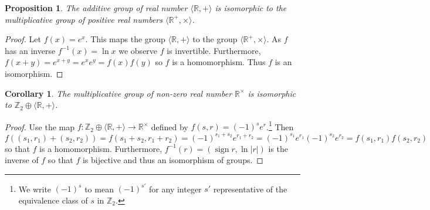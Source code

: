 \documentclass[12pt]{article}
\newtheorem{coro}[thm]{Corollary}
\newtheorem{prop}[thm]{Proposition}
\begin{document}
\begin{prop}
The additive group of real number $\langle \mathbb{R},+\rangle$ is isomorphic
to the multiplicative group of positive real numbers $\langle \mathbb{R}^+,\times\rangle$.
\end{prop}
\begin{proof}
Let $f(x)=e^x$.  This maps the group $\langle \mathbb{R},+\rangle$ to the group
$\langle \mathbb{R}^+,\times\rangle$.  As $f$ has an inverse $f^{-1}(x)=\ln x$
we observe $f$ is invertible.  Furthermore, $f(x+y)=e^{x+y}=e^x e^y=f(x)f(y)$ so
$f$ is a homomorphism.  Thus $f$ is an isomorphism.
\end{proof}

\begin{coro}
The multiplicative group of non-zero real number $\mathbb{R}^\times$ is isomorphic to $\mathbb{Z}_2\oplus \langle \mathbb{R},+\rangle$.
\end{coro}
\begin{proof}
Use the map $f:\mathbb{Z}_2\oplus \langle \mathbb{R},+\rangle\rightarrow \mathbb{R}^\times$ defined by $f(s,r)=(-1)^s e^r$.\footnote{We write $(-1)^s$ to mean $(-1)^{s'}$ for any integer $s'$ representative of the equivalence class of $s$ in
$\mathbb{Z}_2$.}  Then 
\[f((s_1,r_1)+(s_2,r_2))=f(s_1+s_2,r_1+r_2)=(-1)^{s_1+s_2}e^{r_1+r_2}
=(-1)^{s_1} e^{r_1} (-1)^{s_2}e^{r_2}=f(s_1,r_1) f(s_2,r_2)\]
so that $f$ is a homomorphism.  Furthermore, $f^{-1}(r)=(\operatorname{sign} r,\ln |r|)$
is the inverse of $f$ so that $f$ is bijective and thus an isomorphism of groups.
\end{proof}


\end{document}
